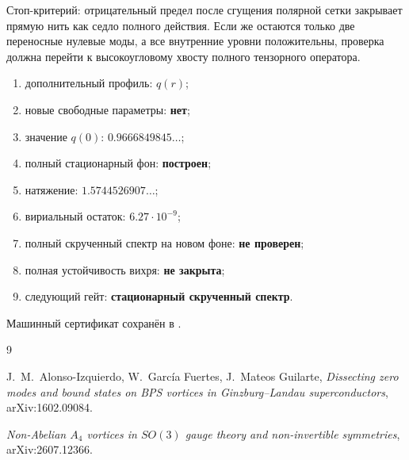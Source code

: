 Стоп-критерий: отрицательный предел после сгущения полярной сетки закрывает
прямую нить как седло полного действия. Если же остаются только две
переносные нулевые моды, а все внутренние уровни положительны, проверка должна
перейти к высокоугловому хвосту полного тензорного оператора.

\begin{protocol}
\begin{enumerate}
 \item дополнительный профиль: \textbf{$q(r)$};
 \item новые свободные параметры: \textbf{нет};
 \item значение $q(0)$: \textbf{$0.9666849845\ldots$};
 \item полный стационарный фон: \textbf{построен};
 \item натяжение: \textbf{$1.5744526907\ldots$};
 \item вириальный остаток: \textbf{$6.27\cdot10^{-9}$};
 \item полный скрученный спектр на новом фоне: \textbf{не проверен};
 \item полная устойчивость вихря: \textbf{не закрыта};
 \item следующий гейт: \textbf{стационарный скрученный спектр}.
\end{enumerate}
\end{protocol}

Машинный сертификат сохранён в
.

\begin{thebibliography}{9}\raggedright
{}
J.~M.~Alonso-Izquierdo, W.~Garc\'ia Fuertes, J.~Mateos Guilarte,
\emph{Dissecting zero modes and bound states on BPS vortices in
Ginzburg--Landau superconductors}, arXiv:1602.09084.

\emph{Non-Abelian $A_4$ vortices in $SO(3)$ gauge theory and
non-invertible symmetries}, arXiv:2607.12366.
\end{thebibliography}